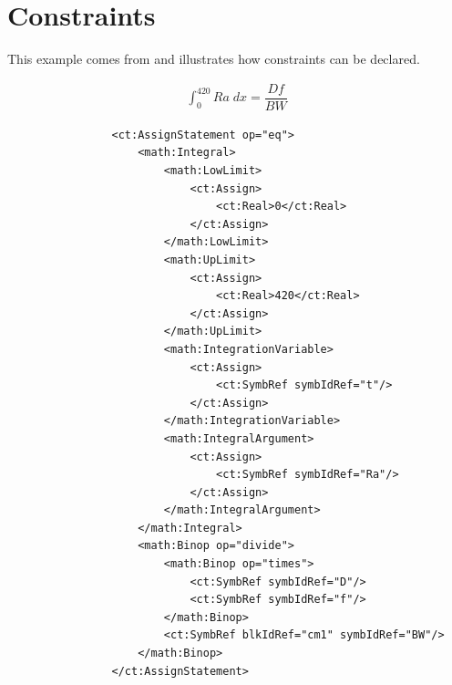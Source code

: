 \section{Constraints}
\label{sec:constraints}

This example comes from \cite{Dalla-Man:2002bs} and illustrates how 
constraints can be declared.

\begin{align}
\int_{0}^{420} Ra \; dx = \dfrac{D f}{BW} \nonumber 
\end{align}

\lstset{language=XML}
\begin{lstlisting}
                <ct:AssignStatement op="eq">
                    <math:Integral>
                        <math:LowLimit>
                            <ct:Assign>
                                <ct:Real>0</ct:Real>
                            </ct:Assign>
                        </math:LowLimit>
                        <math:UpLimit>
                            <ct:Assign>
                                <ct:Real>420</ct:Real>
                            </ct:Assign>
                        </math:UpLimit>
                        <math:IntegrationVariable>
                            <ct:Assign>
                                <ct:SymbRef symbIdRef="t"/>
                            </ct:Assign>
                        </math:IntegrationVariable>
                        <math:IntegralArgument>
                            <ct:Assign>
                                <ct:SymbRef symbIdRef="Ra"/>
                            </ct:Assign>
                        </math:IntegralArgument>
                    </math:Integral>
                    <math:Binop op="divide">
                        <math:Binop op="times">
                            <ct:SymbRef symbIdRef="D"/>
                            <ct:SymbRef symbIdRef="f"/>
                        </math:Binop>
                        <ct:SymbRef blkIdRef="cm1" symbIdRef="BW"/>
                    </math:Binop>
                </ct:AssignStatement>
\end{lstlisting}


